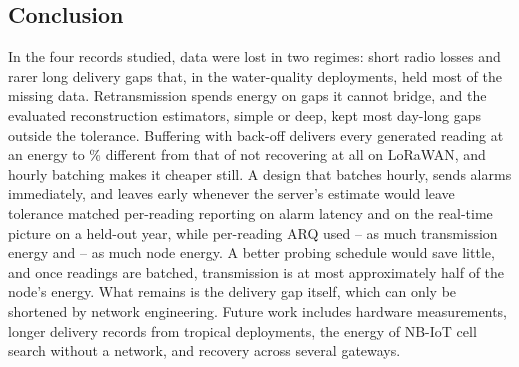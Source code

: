 \subsection{Conclusion}
In the four records studied, data were lost in two regimes: short radio losses and rarer long delivery gaps that, in the water-quality deployments, held most of the missing data. Retransmission spends energy on gaps it cannot bridge, and the evaluated reconstruction estimators, simple or deep, kept most day-long gaps outside the tolerance. Buffering with back-off delivers every generated reading at an energy \bufLoMin{} to \bufLoMax\% different from that of not recovering at all on LoRaWAN, and hourly batching makes it cheaper still. A design that batches hourly, sends alarms immediately, and leaves early whenever the server's estimate would leave tolerance matched per-reading reporting on alarm latency and on the real-time picture on a held-out year, while per-reading ARQ used \arqOverBoundedMinConf--\arqOverBoundedMaxConf{} as much transmission energy and \nodeArqOverFinalMin--\nodeArqOverFinalMax{} as much node energy. A better probing schedule would save little, and once readings are batched, transmission is at most approximately half of the node's energy. What remains is the delivery gap itself, which can only be shortened by network engineering. Future work includes hardware measurements, longer delivery records from tropical deployments, the energy of NB-IoT cell search without a network, and recovery across several gateways.
